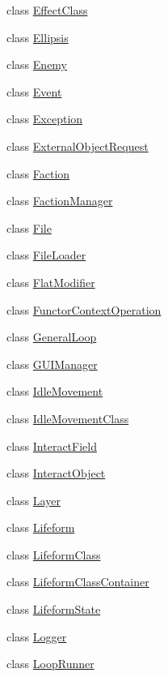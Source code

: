 \begin{DoxyCompactItemize}
\item 
class \hyperlink{classZeta_1_1EffectClass}{Effect\+Class}
\item 
class \hyperlink{classZeta_1_1Ellipsis}{Ellipsis}
\item 
class \hyperlink{classZeta_1_1Enemy}{Enemy}
\item 
class \hyperlink{classZeta_1_1Event}{Event}
\item 
class \hyperlink{classZeta_1_1Exception}{Exception}
\item 
class \hyperlink{classZeta_1_1ExternalObjectRequest}{External\+Object\+Request}
\item 
class \hyperlink{classZeta_1_1Faction}{Faction}
\item 
class \hyperlink{classZeta_1_1FactionManager}{Faction\+Manager}
\item 
class \hyperlink{classZeta_1_1File}{File}
\item 
class \hyperlink{classZeta_1_1FileLoader}{File\+Loader}
\item 
class \hyperlink{classZeta_1_1FlatModifier}{Flat\+Modifier}
\item 
class \hyperlink{classZeta_1_1FunctorContextOperation}{Functor\+Context\+Operation}
\item 
class \hyperlink{classZeta_1_1GeneralLoop}{General\+Loop}
\item 
class \hyperlink{classZeta_1_1GUIManager}{G\+U\+I\+Manager}
\item 
class \hyperlink{classZeta_1_1IdleMovement}{Idle\+Movement}
\item 
class \hyperlink{classZeta_1_1IdleMovementClass}{Idle\+Movement\+Class}
\item 
class \hyperlink{classZeta_1_1InteractField}{Interact\+Field}
\item 
class \hyperlink{classZeta_1_1InteractObject}{Interact\+Object}
\item 
class \hyperlink{classZeta_1_1Layer}{Layer}
\item 
class \hyperlink{classZeta_1_1Lifeform}{Lifeform}
\item 
class \hyperlink{classZeta_1_1LifeformClass}{Lifeform\+Class}
\item 
class \hyperlink{classZeta_1_1LifeformClassContainer}{Lifeform\+Class\+Container}
\item 
class \hyperlink{classZeta_1_1LifeformState}{Lifeform\+State}
\item 
class \hyperlink{classZeta_1_1Logger}{Logger}
\item 
class \hyperlink{classZeta_1_1LoopRunner}{Loop\+Runner}

\end{DoxyCompactItemize}
